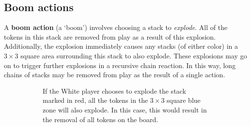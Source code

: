 \documentclass[]{article}
\newcommand{\white}[3] {
    \foreach \x in {1,...,#3}
        \node[draw,thick,minimum size=17,fill=black!30,circle]
            at ({.5+#1},{\x*.1+.4+#2}) {};
    \node[draw,thick,minimum size=17,fill=white,circle]
        at ({.5+#1},{#3*.1+.5+#2}) {};
    \node[]
        at ({.5+#1},{#3*.1+.5+#2}) {\large #3};
}
\newcommand{\black}[3] {
    \foreach \x in {1,...,#3}
        \node[draw,thick,minimum size=15,fill=black!60,rounded corners=0.6mm]
            at ({.5+#1},{\x*.1+.4+#2}) {};
    \node[draw,thick,minimum size=15,fill=black!30,rounded corners=0.6mm]
        at ({.5+#1},{#3*.1+.5+#2}) {};
    \node[]
        at ({.5+#1},{#3*.1+.5+#2}) {\large #3};
}
\newcommand{\colorSquare}[3] {
  \draw[fill=#1] ({#2},{#3}) rectangle ({#2+1},{#3+1});
}
\newcommand{\board} {
    \tikzset{
        x=0.8cm,
        y=0.8cm,
    }
    \draw[fill=black!5,very thick] (0, 0) rectangle (8, 8);
    \draw[step=1] (0, 0) grid (8, 8);
}
\begin{document}
\newpage

\subsection*{Boom actions}

A \textbf{boom action} (a `boom') involves choosing a stack to
\emph{explode}. All of the tokens in this stack are removed from play as a
result of this explosion.
% 
Additionally, the explosion immediately causes any stacks (of either color)
in a $3 \times 3$ square area surrounding this stack to also explode.
These explosions may go on to trigger further explosions in a recursive
chain reaction.
In this way, long chains of stacks may be removed from play as the result
of a single action.

\begin{figure}[ht!]
\centering
\begin{subfigure}{.37\textwidth}
    \centering
    \caption{\label{fig:radius}
        If the White player chooses to explode the stack marked in red, all
        the tokens in the $3 \times 3$ square blue zone will also explode.
        In this case, this would result in the removal of all tokens on the
        board.
        \vspace{2\baselineskip}
    }
\end{subfigure}
\begin{subfigure}{.01\textwidth}
\phantom{SP}
\end{subfigure}
\begin{subfigure}{.60\textwidth}
    \centering
\end{subfigure}
\end{figure}
\end{document}
